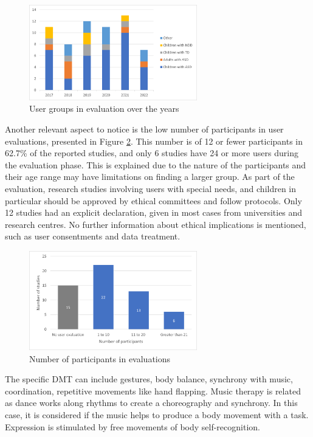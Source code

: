 \documentclass[a4paper,fleqn]{cas-sc}
\begin{document}
\begin{figure}
	\includegraphics[width=0.65\textwidth]{fig3_user-group-years.png}
        \centering
	  \caption{User groups in evaluation over the years}
        \label{fig:user-groups-years}
\end{figure}

Another relevant aspect to notice is the low number of participants in user evaluations, presented in Figure \ref{fig:user-count-eval}. This number is of 12 or fewer participants in 62.7\% of the reported studies, and only 6 studies have 24 or more users during the evaluation phase. This is explained due to the nature of the participants and their age range may have limitations on finding a larger group. 
As part of the evaluation, research studies involving users with special needs, and children in particular should be approved by ethical committees and follow protocols. Only 12 studies had an explicit declaration, given in most cases from universities and research centres. No further information about ethical implications is mentioned, such as user consentments and data treatment.

\begin{figure}
	\includegraphics[width=0.65\textwidth]{fig4_user-number-eval.png}
        \centering
	  \caption{Number of participants in evaluations}\label{fig:user-count-eval}
\end{figure}

The specific DMT can include gestures, body balance, synchrony with music, coordination, repetitive movements like hand flapping. Music therapy is related as dance works along rhythms to create a choreography and synchrony. In this case, it is considered if the music helps to produce a body movement with a task. Expression is stimulated by free movements of body self-recognition.
\end{document}
